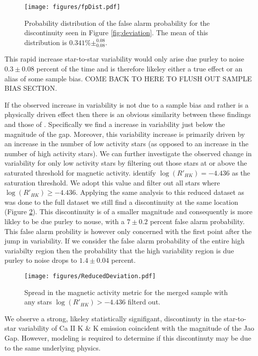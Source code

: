 \begin{figure}
  \centering
  \texttt{[image: figures/fpDist.pdf]}
  \caption{Probability distribution of the false alarm probability for the
  discontinuity seen in Figure \ref{fig:deviation}. The mean of this
  distribution is $0.341\%\pm^{0.08}_{0.08}$.}
  \label{fig:dist}
\end{figure}

This rapid increase star-to-star variability would only arise due purley to
noise $0.3\pm0.08$ percent of the time and is therefore likeley either a true
effect or an alias of some sample bias. {\color{red} COME BACK TO HERE TO FLUSH
OUT SAMPLE BIAS SECTION.}

If the observed increase in variability is not due to a sample bias and rather
is a physically driven effect then there is an obvious similarity between these
findings and those of \citep{Jao2023}. Specifically we find a increase in
variability just below the magnitude of the gap. Moreover, this variability
increase is primarily driven by an increase in the number of low activity stars
(as opposed to an increase in the number of high activity stars). We can
further investigate the observed change in variability for only low activity
stars by filtering out those stars at or above the saturated threshold for
magnetic activity. \citet{Boudreaux2022} identify $\log(R'_{HK}) = -4.436$ as
the saturation threshold. We adopt this value and filter out all stars where
$\log(R'_{HK}) \geq -4.436$. Applying the same analysis to this reduced dataset
as was done to the full dataset we still find a discontinuity at the same
location (Figure \ref{fig:reduced}). This discontinuity is of a smaller
magnitude and consequently is more likley to be due purley to nouse, with a
$7\pm0.2$ percent false alarm probability. This false alarm probility is
however only concerned with the first point after the jump in variability. If
we consider the false alarm probability of the entire high variabilty region
then the probability that the high variability region is due purley to noise
drops to $1.4\pm0.04$ percent.

\begin{figure}
  \centering
  \texttt{[image: figures/ReducedDeviation.pdf]}
  \caption{Spread in the magnetic activity metric for the merged sample with
  any stars $\log(R'_{HK}) > -4.436$ filterd out.}
  \label{fig:reduced}
\end{figure}

We observe a strong, likeley statistically signifigant, discontinuty in the
star-to-star variability of Ca II K \& K emission coincident with the magnitude
of the Jao Gap. However, modeling is required to determine if this discontinuty
may be due to the same underlying physics.
